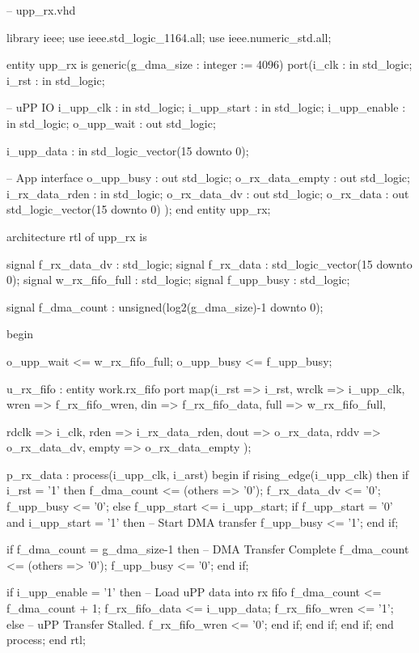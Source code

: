 \begin{VHDLlisting}[tabsize=2]
-- upp_rx.vhd

library ieee;
	use ieee.std_logic_1164.all;
	use ieee.numeric_std.all;
	
entity upp_rx is
	generic(g_dma_size : integer := 4096)
	port(i_clk           : in    std_logic;
	     i_rst           : in    std_logic;
		 
		 -- uPP IO
		 i_upp_clk       : in    std_logic; 
		 i_upp_start     : in    std_logic;
		 i_upp_enable    : in    std_logic;
		 o_upp_wait      :   out std_logic;
		 
		 i_upp_data      : in    std_logic_vector(15 downto 0);
		 
		 -- App interface
		 o_upp_busy      :   out std_logic;
		 o_rx_data_empty :   out std_logic;
		 i_rx_data_rden  : in    std_logic;
		 o_rx_data_dv    :   out std_logic;
		 o_rx_data       :   out std_logic_vector(15 downto 0)	
	);
end entity upp_rx;


architecture rtl of upp_rx is
	
	signal f_rx_data_dv   : std_logic;
	signal f_rx_data      : std_logic_vector(15 downto 0);
	signal w_rx_fifo_full : std_logic;
	signal f_upp_busy     : std_logic;
	
	signal f_dma_count    : unsigned(log2(g_dma_size)-1 downto 0);
	
begin

	o_upp_wait <= w_rx_fifo_full;
	o_upp_busy <= f_upp_busy; 

	u_rx_fifo : entity work.rx_fifo
	port map(i_rst => i_rst,
			 wrclk => i_upp_clk, 
			 wren  => f_rx_fifo_wren,
			 din   => f_rx_fifo_data,
			 full  => w_rx_fifo_full,
	
			 rdclk => i_clk,
			 rden  => i_rx_data_rden,
			 dout  => o_rx_data,
			 rddv  => o_rx_data_dv,
			 empty => o_rx_data_empty	
	);

	p_rx_data : process(i_upp_clk, i_arst)
	begin
		if rising_edge(i_upp_clk) then
			if i_rst = '1' then
				f_dma_count <= (others => '0');
				f_rx_data_dv <= '0';
				f_upp_busy <= '0';
			else
				f_upp_start <= i_upp_start;
				if f_upp_start = '0' and i_upp_start = '1' then	
					-- Start DMA transfer
					f_upp_busy <= '1';
				end if;
				
				if f_dma_count = g_dma_size-1 then
					-- DMA Transfer Complete
					f_dma_count <= (others => '0');
					f_upp_busy <= '0';
				end if;
			
				if i_upp_enable = '1' then
					-- Load uPP data into rx fifo
					f_dma_count <= f_dma_count + 1;
					f_rx_fifo_data <= i_upp_data;
					f_rx_fifo_wren <= '1';
				else
					-- uPP Transfer Stalled.
					f_rx_fifo_wren <= '0';
				end if;
			end if;
		end if;
	end process;	
end rtl;
\end{VHDLlisting}

